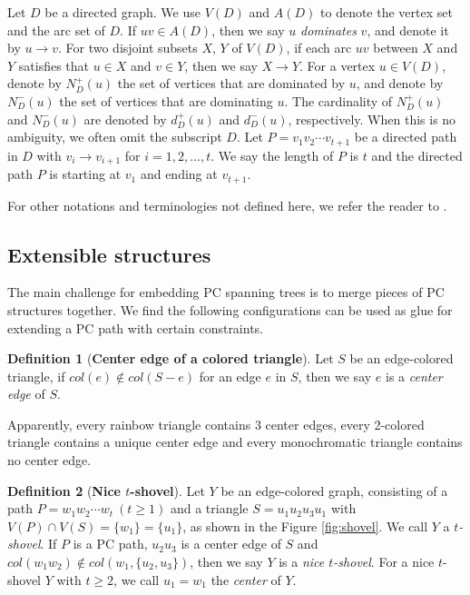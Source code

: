 \documentclass[11pt,a4paper]{article}
\theoremstyle{definition}
\newtheorem{definition}{Definition}
\begin{document}
Let $D$ be a directed graph. We use $V(D)$ and $A(D)$ to denote the vertex set and the arc set of $D$. If $uv\in A(D)$, then we say $u$ {\it dominates} $v$,  and denote it by $u \rightarrow v$. For two disjoint subsets $X$,  $Y$ of $V(D)$,  if each arc $uv$ between $X$ and $Y$ satisfies that $u\in X$ and $v\in Y$,  then we say $X \rightarrow Y $.   For a vertex $u\in V(D)$,  denote by $N^+_D(u)$ the set of vertices that are dominated by $u$,  and denote by $N^-_D(u)$ the set of vertices that are dominating $u$. The cardinality of $N^+_D(u)$ and $N^-_D(u)$ are denoted by $d^+_D(u)$ and $d^-_D(u)$, respectively. When this is no ambiguity, we often omit the subscript $D$. Let $P=v_1v_2\cdots v_{t+1}$ be a directed path in $D$ with $v_i \rightarrow v_{i+1}$ for $i=1,2,\ldots,t$. We say the length of $P$ is $t$ and the directed path $P$ is starting at $v_1$ and ending at $v_{t+1}$.

For other notations and terminologies not defined here, we refer the reader to \cite{bondy2008graph}.


\subsection{Extensible structures}
The main challenge for embedding PC spanning trees is to merge pieces of PC structures together. We find the following configurations can be used as glue for extending a PC path with certain constraints.

\begin{definition}[\textbf{Center edge of a colored triangle}]
Let $S$ be an edge-colored triangle, if
$col(e)\not\in col(S-e)$ for an edge $e$ in $S$, then we say $e$ is a \textit{center edge} of $S$.
\end{definition}
Apparently, every rainbow triangle contains $3$ center edges, every 2-colored triangle contains a unique center edge and every monochromatic triangle contains no center edge.

\begin{definition}[\textbf{Nice $t$-shovel}]
Let $Y$ be an edge-colored graph, consisting of a path $P=w_1w_2\cdots w_t~(t\geq 1)$ and a triangle $S=u_1u_2u_3u_1$ with $V(P)\cap V(S)=\{w_1\}=\{u_1\}$, as shown in the Figure \ref{fig:shovel}.  We call $Y$ a \textit{$t$-shovel}. If $P$ is a PC path, $u_2u_3$ is a center edge of $S$ and $col(w_1w_2)\not\in col\left(w_1,\{u_2,u_3\}\right)$, then we say $Y$ is a \textit{nice $t$-shovel}. For a nice $t$-shovel $Y$ with $t\geq 2$, we call $u_1=w_1$ the {\it center} of $Y$.
\end{definition}
\end{document}

